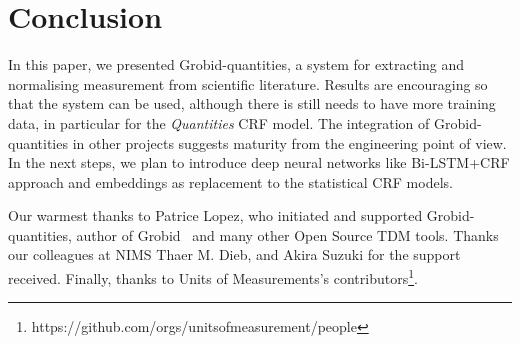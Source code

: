 \documentclass[sigplan, anonymous, review]{acmart}
\begin{document}
\section{Conclusion}
\label{sec:conclusion}
In this paper, we presented Grobid-quantities, a system for extracting and normalising measurement from scientific literature. Results are encouraging so that the system can be used, although there is still needs to have more training data, in particular for the \textit{Quantities} CRF model. The integration of Grobid-quantities in other projects suggests maturity from the engineering point of view. In the next steps, we plan to introduce deep neural networks like Bi-LSTM+CRF approach and embeddings as replacement to the statistical CRF models. 

\begin{acks}
Our warmest thanks to Patrice Lopez, who initiated and supported Grobid-quantities, author of Grobid~\cite{GROBID} and many other Open Source TDM tools. Thanks our colleagues at NIMS Thaer M. Dieb, and Akira Suzuki for the support received. Finally, thanks to Units of Measurements's contributors\footnote{https://github.com/orgs/unitsofmeasurement/people}.
\end{acks}




\end{document}

